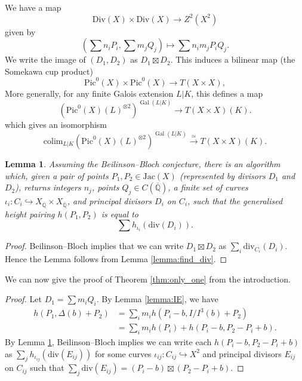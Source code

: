 \documentclass[11pt]{amsart}
\def\Q{\mathbb Q}
\newcommand{\Div}{\mathrm{Div}}
\newcommand{\divv}{\mathrm{div}}
\theoremstyle{plain}
\newtheorem{lemma}{Lemma}
\theoremstyle{definition}
\newcommand{\Jac}{\mathrm{Jac}}
\DeclareMathOperator{\Gal}{Gal}
\newcommand{\Pic}{\mathrm{Pic}}
\newcommand{\colim}{\mathrm{colim}}
\begin{document}
We have a map \cite{somekawa} \cite{RS}
\[
\Div (X)\times \Div (X)\to Z^2 (X^2 )
\]
given by
\[
(\sum n_i P_i ,\sum m_j Q_j )\mapsto \sum n_i m_j P_i Q_j .
\]
We write the image of $(D_1 ,D_2 )$ as $D_1 \boxtimes D_2 $.
This induces a bilinear map (the Somekawa cup product)
\[
\Pic ^0 (X)\times \Pic ^0 (X)\to T(X\times X),
\]
More generally, for any finite Galois extension $L|K$,  this defines a map
\[
(\Pic ^0 (X)(L)^{\otimes 2} )^{\Gal (L|K)}\to T(X\times X)(K).
\]
which gives an isomorphism \cite{RS}
\[
\colim _{L|K}(\Pic ^0 (X)(L)^{\otimes 2} )^{\Gal (L|K)}\stackrel{\simeq }{\longrightarrow} T(X\times X)(K).
\]
\begin{lemma}\label{lemma:only_one}
Assuming the Beilinson--Bloch conjecture, there is an algorithm which, given a pair of points $P_1 , P_2 \in \Jac (X)$ (represented by divisors $D_1 $ and $D_2$), returns integers $n_j $, points $Q_j \in C(\overline{\Q })$, a finite set of curves $\iota _i :C_i \hookrightarrow X_{\overline{\Q }}\times X_{\overline{\Q }}$, and principal divisors $D_i $ on $C_i$, such that the generalised height pairing $h(P_1 ,P_2 )$ is equal to
\[
\sum h_{\iota _i }(\divv (D_i )).
\]
\end{lemma}
\begin{proof}
Beilinson--Bloch implies that we can write $D_1 \boxtimes D_2 $ as $\sum _i \divv _{C_i }(D_i )$. Hence the Lemma follows from Lemma \ref{lemma:find_div}.
\end{proof}
We can now give the proof of Theorem \ref{thm:only_one} from the introduction.
\begin{proof}
Let $D_1 =\sum m_i Q_i $.
By Lemma \ref{lemma:IE}, we have
\begin{align*}
h(P_1 ,\Delta (b)+P_2 ) & =\sum _i m_i h(P_i -b ,I/I^3 (b)+P_2 ) \\
& =\sum _i m_i h(P_i)+h(P_i -b,P_2 -P_i +b).
\end{align*}
By Lemma \ref{lemma:only_one}, Beilinson--Bloch implies we can write each $h(P_i -b,P_2 -P_i +b)$ as $\sum _j h_{\iota _{ij} }(\divv (E_{ij}))$ for some curves $\iota _{ij}:C_{ij}\hookrightarrow X^2 $ and principal divisors $E_{ij}$ on $C_{ij}$ such that $\sum _j \divv (E_{ij})=(P_i -b)\boxtimes (P_2 -P_i +b)$.
\end{proof}
\end{document}
